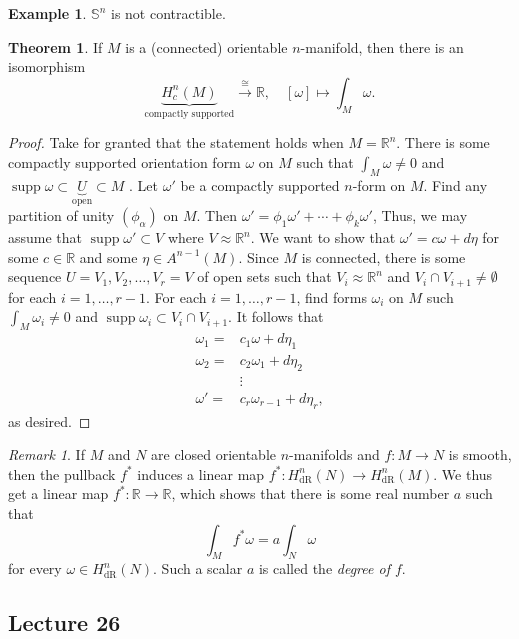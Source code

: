 \documentclass[10pt,letterpaper,cm]{nupset}
\theoremstyle{definition}
\newtheorem{exmp}[definition]{Example}
\theoremstyle{theorem}
\newtheorem{theorem}[definition]{Theorem}
\theoremstyle{remark}
\newtheorem{remark}[definition]{Remark}
\newcommand{\R}{\mathbb R}
\renewcommand{\S}{\mathbb S}
\newcommand{\1}{\mathbf{1}}
\newcommand{\0}{\vec 0}
\DeclareMathOperator{\supp}{supp}
\DeclareMathOperator{\dr}{dR}
\begin{document}
\begin{exmp}
$\S^n$ is not contractible.
\end{exmp}

\begin{theorem}
If $M$ is a (connected) orientable $n$-manifold, then there is an isomorphism $$\underbrace{H_c^n(M)}_{\text{compactly supported}} \overset{\cong}{\longrightarrow} \R, \quad [\omega] \mapsto \int_M \omega.$$
\end{theorem}
\begin{proof}
Take for granted that the statement holds when $M = \R^n$. There is some compactly supported orientation form $\omega$ on $M$ such that $\int_M \omega \ne 0$ and $\supp \omega \subset \underbrace{U}_{\text{open}}\subset M$ . Let $\omega'$ be a compactly supported $n$-form on $M$. Find any partition of unity $(\phi_{\alpha})$ on $M$. Then $\omega' =\phi_1\omega' +\cdots + \phi_k \omega'$, Thus, we may assume  that $\supp \omega' \subset V$ where $V \approx \R^n$. We want to show that $\omega' =c\omega + d\eta$ for some $c\in \R$ and some $\eta \in A^{n-1}(M)$. Since $M$ is connected, there is some sequence $U=V_1, V_2, \ldots, V_r=V$ of open sets such that $V_i\approx \R^n$ and $V_i\cap V_{i+1} \ne \emptyset$ for each $i=1, \ldots, r-1$. For each $i=1, \ldots, r-1$, find forms $\omega_i$ on $M$ such $\int_M \omega_i \ne 0$ and $\supp \omega_i \subset V_i \cap V_{i+1}$.  It follows that 
\begin{align*}
 \omega_1  =& c_1\omega + d\eta_1
\\ \omega_2  =& c_2\omega_1+ d\eta_2
\\ & \vdots
\\  \omega'  =&  c_r\omega_{r-1}+d\eta_r
, \end{align*} as desired.
\end{proof}

\begin{remark}
If $M$ and $N$ are closed orientable $n$-manifolds and $f: M \to N$ is smooth, then the pullback $f^{\ast}$ induces a linear map $f^{\ast}: H_{\dr}^n(N) \to H_{\dr}^n(M)$. We thus get a linear map $f^{\ast} : \R \to \R$, which shows that there is some  real number $a$ such that $$\int_{M} f^{\ast} \omega = a\int_N \omega$$ for every $\omega \in H_{\dr}^n(N) $. Such a scalar $a$ is called the \textit{degree of $f$}. 
\end{remark}

\subsection{Lecture 26}
\end{document}
